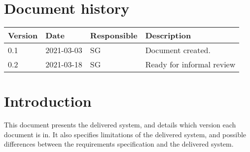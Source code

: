 \documentclass{article}
\date {#1}
\title {
    \documentNumber {01}    
    
    \documentVersion {0.1}
    
    \documentTitle {Template}
    \documentGroup {2}
    
    \documentResponsible {System Group}
    \documentAuthors {System group}
    
    \documentDate {2021-03-18}
}
\begin{document}
\maketitle
\thispagestyle{empty}

\newpage

\tableofcontents

\newpage



\section{Document history}

\begin{tabular}{ l | l | l | l }
    Version & Date & Responsible & Description \\
    \hline
    0.1 & 2021-03-03 & SG & Document created. \\
    \hline
    0.2 & 2021-03-18 & SG & Ready for informal review
   
\end{tabular}

\section{Introduction}
    This document presents the delivered system, and details which version each document is in. It also specifies limitations of the delivered system, and possible differences between the requirements specification and the delivered system.
\end{document}
